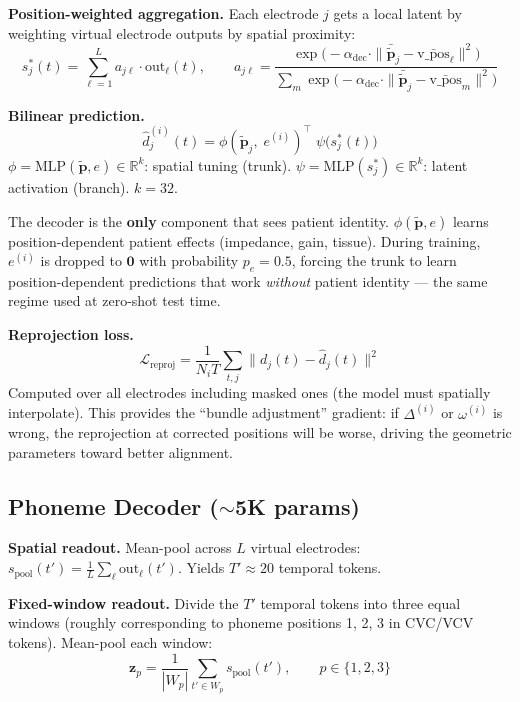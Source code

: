 \documentclass[11pt,letterpaper]{article}
\newcommand{\bfp}{\mathbf{p}}
\newcommand{\bfz}{\mathbf{z}}
\newcommand{\R}{\mathbb{R}}
\begin{document}
\textbf{Position-weighted aggregation.} Each electrode $j$ gets a local latent by weighting virtual electrode outputs by spatial proximity:
\begin{equation}
s_j^*(t) = \sum_{\ell=1}^{L} a_{j\ell} \cdot \text{out}_\ell(t), \qquad
a_{j\ell} = \frac{\exp\bigl(-\alpha_{\text{dec}} \cdot \|\bar{\tilde{\bfp}}_j - \bar{\text{v\_pos}}_\ell\|^2\bigr)}
             {\sum_{m} \exp\bigl(-\alpha_{\text{dec}} \cdot \|\bar{\tilde{\bfp}}_j - \bar{\text{v\_pos}}_m\|^2\bigr)}
\end{equation}

\textbf{Bilinear prediction.}
\begin{equation}\label{eq:bilinear}
\hat{d}_j^{(i)}(t) = \phi(\tilde{\bfp}_j,\; e^{(i)})^\top \;\psi\bigl(s_j^*(t)\bigr)
\end{equation}
$\phi = \text{MLP}(\tilde{\bfp}, e) \in \R^k$: spatial tuning (trunk). $\psi = \text{MLP}(s_j^*) \in \R^k$: latent activation (branch). $k{=}32$.

The decoder is the \textbf{only} component that sees patient identity. $\phi(\tilde{\bfp}, e)$ learns position-dependent patient effects (impedance, gain, tissue). During training, $e^{(i)}$ is dropped to $\mathbf{0}$ with probability $p_e{=}0.5$, forcing the trunk to learn position-dependent predictions that work \textit{without} patient identity --- the same regime used at zero-shot test time.

\textbf{Reprojection loss.}
\begin{equation}
\mathcal{L}_{\text{reproj}} = \frac{1}{N_i T} \sum_{t,j} \bigl\| d_j(t) - \hat{d}_j(t) \bigr\|^2
\end{equation}
Computed over all electrodes including masked ones (the model must spatially interpolate). This provides the ``bundle adjustment'' gradient: if $\Delta^{(i)}$ or $\omega^{(i)}$ is wrong, the reprojection at corrected positions will be worse, driving the geometric parameters toward better alignment.


\subsection{Phoneme Decoder (${\sim}$5K params)}\label{sec:phoneme-decoder}

\textbf{Spatial readout.} Mean-pool across $L$ virtual electrodes: $s_{\text{pool}}(t') = \frac{1}{L}\sum_{\ell} \text{out}_\ell(t')$. Yields $T' \approx 20$ temporal tokens.

\textbf{Fixed-window readout.} Divide the $T'$ temporal tokens into three equal windows (roughly corresponding to phoneme positions 1, 2, 3 in CVC/VCV tokens). Mean-pool each window:
\begin{equation}
\bfz_p = \frac{1}{|W_p|}\sum_{t' \in W_p} s_{\text{pool}}(t'), \qquad p \in \{1,2,3\}
\end{equation}
\end{document}
